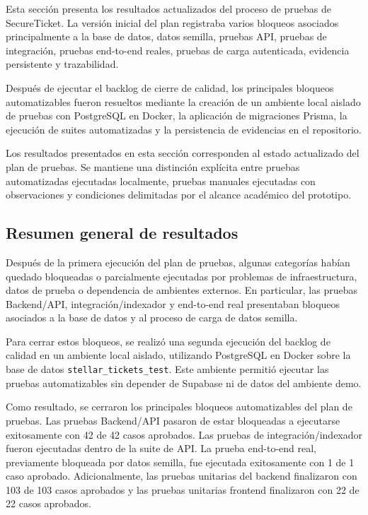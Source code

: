 \documentclass[12pt,letterpaper]{article}
\newcommand{\NombreProyecto}{SecureTicket}
\begin{document}
Esta sección presenta los resultados actualizados del proceso de pruebas de \NombreProyecto{}. La versión inicial del plan registraba varios bloqueos asociados principalmente a la base de datos, datos semilla, pruebas API, pruebas de integración, pruebas end-to-end reales, pruebas de carga autenticada, evidencia persistente y trazabilidad.

Después de ejecutar el backlog de cierre de calidad, los principales bloqueos automatizables fueron resueltos mediante la creación de un ambiente local aislado de pruebas con PostgreSQL en Docker, la aplicación de migraciones Prisma, la ejecución de suites automatizadas y la persistencia de evidencias en el repositorio.

Los resultados presentados en esta sección corresponden al estado actualizado del plan de pruebas. Se mantiene una distinción explícita entre pruebas automatizadas ejecutadas localmente, pruebas manuales ejecutadas con observaciones y condiciones delimitadas por el alcance académico del prototipo.

\subsection{Resumen general de resultados}

Después de la primera ejecución del plan de pruebas, algunas categorías habían quedado bloqueadas o parcialmente ejecutadas por problemas de infraestructura, datos de prueba o dependencia de ambientes externos. En particular, las pruebas Backend/API, integración/indexador y end-to-end real presentaban bloqueos asociados a la base de datos y al proceso de carga de datos semilla.

Para cerrar estos bloqueos, se realizó una segunda ejecución del backlog de calidad en un ambiente local aislado, utilizando PostgreSQL en Docker sobre la base de datos \texttt{stellar\_tickets\_test}. Este ambiente permitió ejecutar las pruebas automatizables sin depender de Supabase ni de datos del ambiente demo.

Como resultado, se cerraron los principales bloqueos automatizables del plan de pruebas. Las pruebas Backend/API pasaron de estar bloqueadas a ejecutarse exitosamente con 42 de 42 casos aprobados. Las pruebas de integración/indexador fueron ejecutadas dentro de la suite de API. La prueba end-to-end real, previamente bloqueada por datos semilla, fue ejecutada exitosamente con 1 de 1 caso aprobado. Adicionalmente, las pruebas unitarias del backend finalizaron con 103 de 103 casos aprobados y las pruebas unitarias frontend finalizaron con 22 de 22 casos aprobados.
\end{document}
